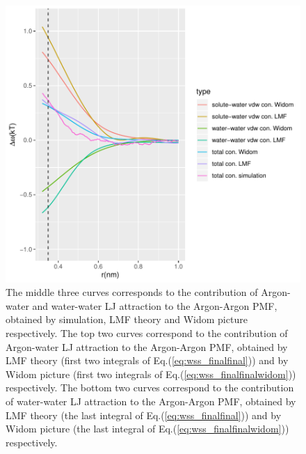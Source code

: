 \documentclass[9pt]{article}
\begin{document}
\begin{figure}[htp]
\centering
\includegraphics[scale=0.8]{widom_LMF_sim_ArAr.pdf}
\caption{The middle three curves  corresponds to the contribution of   Argon-water and water-water LJ attraction to the Argon-Argon PMF, obtained by simulation, LMF theory and Widom picture respectively. The top two curves correspond to the contribution of   Argon-water LJ attraction to the Argon-Argon PMF, obtained by LMF theory (first two integrals of Eq.(\ref{eq:wss_finalfinal})) and by Widom picture (first two integrals of Eq.(\ref{eq:wss_finalfinalwidom})) respectively. The bottom two curves correspond to the contribution of water-water LJ attraction to the Argon-Argon PMF, obtained by LMF theory (the last integral of Eq.(\ref{eq:wss_finalfinal})) and by Widom picture (the last integral of Eq.(\ref{eq:wss_finalfinalwidom})) respectively. }
\label{fig:pmf_ArAr}
\end{figure}
\end{document}

